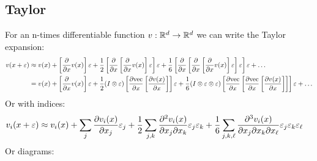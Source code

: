 \subsection{Taylor}
For an n-times differentiable function $v: \mathbb R^d\to\mathbb R^d$ we can write the Taylor expansion:
\begin{align*}
    v(x + \varepsilon)
    &\approx
    v(x)
    + \left[\frac{\partial}{\partial x} v(x)\right]\varepsilon
    + \frac{1}{2}\left[\frac{\partial}{\partial x}\left[\frac{\partial}{\partial x} v(x)\right]\varepsilon\right]\varepsilon
    + \frac{1}{6}\left[\frac{\partial}{\partial x}\left[\frac{\partial}{\partial x} \left[\frac{\partial}{\partial x} v(x)\right]\varepsilon\right]\varepsilon\right]\varepsilon
    + \dots
    \\
    &=
    v(x)
    + \left[\frac{\partial}{\partial x} v(x)\right]\varepsilon
    +
    \frac{1}{2}
    (I \otimes \varepsilon)
    \left[\frac{\partial\mathrm{vec}}{\partial x}\left[\frac{\partial v(x)}{\partial x} \right]\right]\varepsilon
    + \frac{1}{6}
    (I \otimes \varepsilon \otimes \varepsilon)
    \left[\frac{\partial\mathrm{vec}}{\partial x}\left[\frac{\partial\mathrm{vec}}{\partial x} \left[\frac{\partial v(x)}{\partial x} \right]\right]\right]\varepsilon
    + \dots
\end{align*}
Or with indices:
\begin{align*}
    v_i(x + \varepsilon)
    &\approx
    v_i(x)
    + \sum_j \frac{\partial v_i(x)}{\partial x_j} \varepsilon_j
    + \frac12 \sum_{j,k} \frac{\partial^2 v_i(x)}{\partial x_j\partial x_k} \varepsilon_j \varepsilon_k
   + \frac16 \sum_{j,k,\ell} \frac{\partial^3 v_i(x)}{\partial x_j\partial x_k\partial x_\ell} \varepsilon_j \varepsilon_k \varepsilon_\ell
\end{align*}
Or diagrams:
